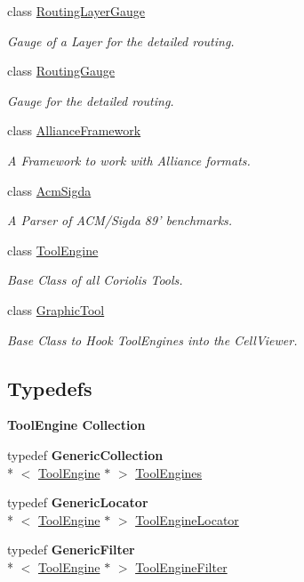 \begin{DoxyCompactItemize}
class \hyperlink{classCRL_1_1RoutingLayerGauge}{Routing\-Layer\-Gauge}
\begin{DoxyCompactList}\small\item\em Gauge of a Layer for the detailed routing. \end{DoxyCompactList}\item 
class \hyperlink{classCRL_1_1RoutingGauge}{Routing\-Gauge}
\begin{DoxyCompactList}\small\item\em Gauge for the detailed routing. \end{DoxyCompactList}\item 
class \hyperlink{classCRL_1_1AllianceFramework}{Alliance\-Framework}
\begin{DoxyCompactList}\small\item\em A Framework to work with Alliance formats. \end{DoxyCompactList}\item 
class \hyperlink{classCRL_1_1AcmSigda}{Acm\-Sigda}
\begin{DoxyCompactList}\small\item\em A Parser of A\-C\-M/\-Sigda 89' benchmarks. \end{DoxyCompactList}\item 
class \hyperlink{classCRL_1_1ToolEngine}{Tool\-Engine}
\begin{DoxyCompactList}\small\item\em Base Class of all Coriolis Tools. \end{DoxyCompactList}\item 
class \hyperlink{classCRL_1_1GraphicTool}{Graphic\-Tool}
\begin{DoxyCompactList}\small\item\em Base Class to Hook Tool\-Engines into the Cell\-Viewer. \end{DoxyCompactList}\end{DoxyCompactItemize}
\subsection*{Typedefs}
\begin{Indent}{\bf Tool\-Engine Collection}\par
\begin{DoxyCompactItemize}
\item 
typedef {\bf Generic\-Collection}\\*
$<$ \hyperlink{classCRL_1_1ToolEngine}{Tool\-Engine} $\ast$ $>$ \hyperlink{namespaceCRL_ae49bc0c5f113bba964680768556dd1b3}{Tool\-Engines}
\item 
typedef {\bf Generic\-Locator}\\*
$<$ \hyperlink{classCRL_1_1ToolEngine}{Tool\-Engine} $\ast$ $>$ \hyperlink{namespaceCRL_a9c6426dc361a7b02fc55b7c19401c7aa}{Tool\-Engine\-Locator}
\item 
typedef {\bf Generic\-Filter}\\*
$<$ \hyperlink{classCRL_1_1ToolEngine}{Tool\-Engine} $\ast$ $>$ \hyperlink{namespaceCRL_a976ed6ed06b1c3510c696de4c8960971}{Tool\-Engine\-Filter}
\end{DoxyCompactItemize}
\end{Indent}



